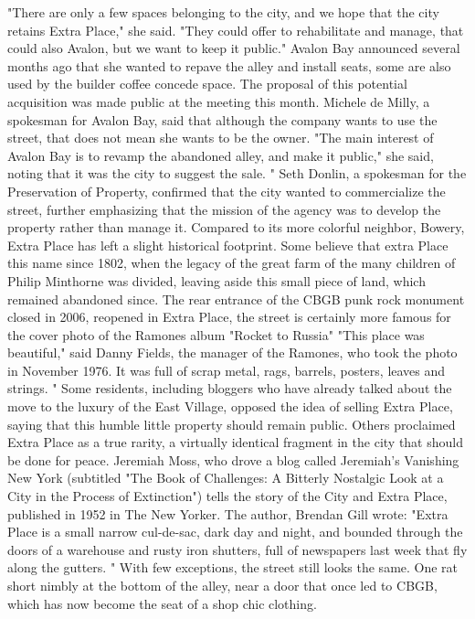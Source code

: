 "There are only a few spaces belonging to the city, and we hope that the city retains Extra Place," she said.
"They could offer to rehabilitate and manage, that could also Avalon, but we want to keep it public."
Avalon Bay announced several months ago that she wanted to repave the alley and install seats, some are also used by the builder coffee concede space.
The proposal of this potential acquisition was made public at the meeting this month.
Michele de Milly, a spokesman for Avalon Bay, said that although the company wants to use the street, that does not mean she wants to be the owner.
"The main interest of Avalon Bay is to revamp the abandoned alley, and make it public," she said, noting that it was the city to suggest the sale. "
Seth Donlin, a spokesman for the Preservation of Property, confirmed that the city wanted to commercialize the street, further emphasizing that the mission of the agency was to develop the property rather than manage it.
Compared to its more colorful neighbor, Bowery, Extra Place has left a slight historical footprint.
Some believe that extra Place this name since 1802, when the legacy of the great farm of the many children of Philip Minthorne was divided, leaving aside this small piece of land, which remained abandoned since.
The rear entrance of the CBGB punk rock monument closed in 2006, reopened in Extra Place, the street is certainly more famous for the cover photo of the Ramones album "Rocket to Russia"
"This place was beautiful," said Danny Fields, the manager of the Ramones, who took the photo in November 1976.
It was full of scrap metal, rags, barrels, posters, leaves and strings. "
Some residents, including bloggers who have already talked about the move to the luxury of the East Village, opposed the idea of ​​selling Extra Place, saying that this humble little property should remain public.
Others proclaimed Extra Place as a true rarity, a virtually identical fragment in the city that should be done for peace.
Jeremiah Moss, who drove a blog called Jeremiah's Vanishing New York (subtitled "The Book of Challenges: A Bitterly Nostalgic Look at a City in the Process of Extinction") tells the story of the City and Extra Place, published in 1952 in The New Yorker.
The author, Brendan Gill wrote: "Extra Place is a small narrow cul-de-sac, dark day and night, and bounded through the doors of a warehouse and rusty iron shutters, full of newspapers last week that fly along the gutters. "
With few exceptions, the street still looks the same.
One rat short nimbly at the bottom of the alley, near a door that once led to CBGB, which has now become the seat of a shop chic clothing.
